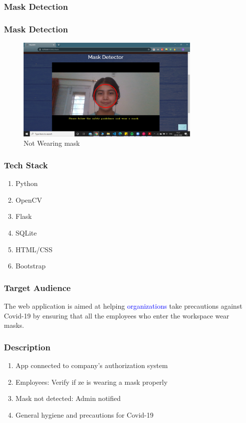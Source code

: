 \documentclass[14pt]{beamer}
\begin{document}
\begin{frame}
    \frametitle{Mask Detection}
    \frametitle{Mask Detection}
    \begin{figure}
    \caption{Not Wearing mask}
    \centering
    \includegraphics[width=0.8\textwidth]{no_mask_}
    \end{figure}
\end{frame}

\begin{frame}
    \frametitle{Tech Stack}
    \begin{enumerate}
        \item Python
        \item OpenCV
        \item Flask
        \item SQLite
        \item HTML/CSS
        \item Bootstrap
    \end{enumerate}
\end{frame} 

\begin{frame}
    \frametitle{Target Audience}
    The web application is aimed at helping \textcolor{blue}{organizations} take precautions against Covid-19 by ensuring that all the employees who enter the workspace wear masks.
\end{frame}

\begin{frame}
    \frametitle{Description}
    \begin{enumerate}
        \item App connected to company's authorization system
        \item Employees: Verify if ze is wearing a mask properly
        \item Mask not detected: Admin notified
        \item General hygiene and precautions for Covid-19
    \end{enumerate}
\end{frame}
\end{document}
